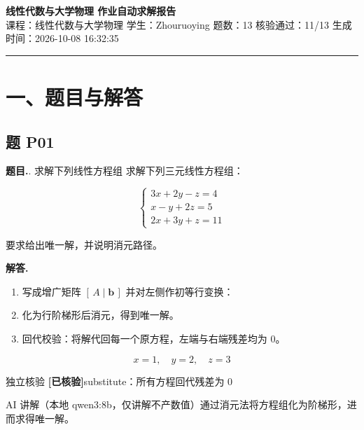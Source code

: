 \documentclass[11pt]{article}
\newcommand{\okmark}{\textcolor{okgreen}{\textbf{[已核验]}}}
\begin{document}
\begin{center}
{\LARGE\bfseries 线性代数与大学物理 作业自动求解报告}\\[6pt]
{\small 课程：线性代数与大学物理 \quad\textbar\quad 学生：Zhouruoying \quad\textbar\quad 题数：13 \quad\textbar\quad 核验通过：11/13 \quad\textbar\quad 生成时间：2026-10-08 16:32:35}
\end{center}
\vspace{6pt}
\hrule
\vspace{10pt}
\section*{一、题目与解答}

\subsection*{题 P01}
\noindent\textbf{题目.}. 求解下列线性方程组
求解下列三元线性方程组：

\[\begin{cases}
3x + 2y - z = 4 \\
x - y + 2z = 5 \\
2x + 3y + z = 11
\end{cases}\]

要求给出唯一解，并说明消元路径。\par
\vspace{4pt}\noindent\textbf{解答.}\quad
\begin{enumerate}[leftmargin=1.6em,itemsep=2pt]
  \item 写成增广矩阵 $\left[\,A \mid \mathbf{b}\,\right]$ 并对左侧作初等行变换：
  \item 化为行阶梯形后消元，得到唯一解。
  \item 回代校验：将解代回每一个原方程，左端与右端残差均为 $0$。
\end{enumerate}
\[ \boxed{x = 1,\quad y = 2,\quad z = 3} \]
\par
\begin{veribox}{独立核验 \okmark}substitute：所有方程回代残差为 0\end{veribox}
\begin{aibox}{AI 讲解（本地 qwen3:8b，仅讲解不产数值）}通过消元法将方程组化为阶梯形，进而求得唯一解。\end{aibox}
\vspace{10pt}
\end{document}
